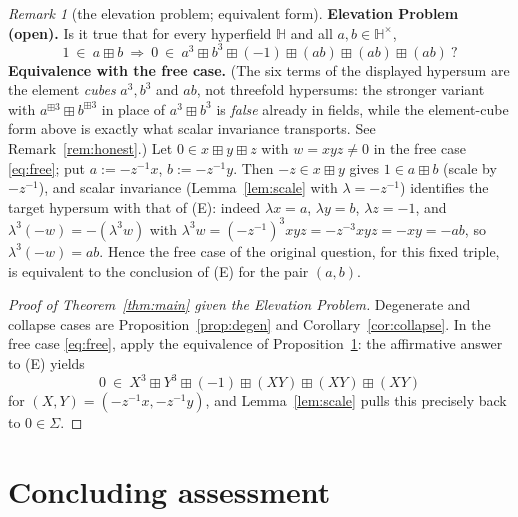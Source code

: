 \documentclass[11pt]{article}
\theoremstyle{definition}
\theoremstyle{remark}
\newtheorem{remark}[theorem]{Remark}
\newcommand{\Hb}{\mathbb{H}}
\newcommand{\bp}{\boxplus}
\begin{document}
\begin{remark}[the elevation problem; equivalent form]\label{prob:elevation}
\textbf{Elevation Problem (open).} Is it true that for every hyperfield
$\Hb$ and all $a,b\in\Hb^\times$,
\[
  1\ \in\ a\bp b\ \Longrightarrow\
   0\ \in\ a^{3}\bp b^{3}\bp(-1)\bp(ab)\bp(ab)\bp(ab)\ ?
   \tag{E}
\]
\textbf{Equivalence with the free case.} (The six terms of the displayed
hypersum are the element \emph{cubes} $a^3,b^3$ and $ab$, not threefold
hypersums: the stronger variant with $a^{\bp3}\bp b^{\bp3}$ in place of
$a^3\bp b^3$ is \emph{false} already in fields, while the element-cube
form above is exactly what scalar invariance transports. See
Remark~\ref{rem:honest}.) Let $0\in x\bp y\bp z$ with
$w=xyz\neq0$ in the free case \eqref{eq:free}; put $a:=-z^{-1}x$,
$b:=-z^{-1}y$. Then $-z\in x\bp y$ gives $1\in a\bp b$ (scale by
$-z^{-1}$), and scalar invariance (Lemma~\ref{lem:scale} with
$\lambda=-z^{-1}$) identifies the target hypersum with that of (E):
indeed $\lambda x=a$, $\lambda y=b$, $\lambda z=-1$, and
$\lambda^3(-w)=-(\lambda^3w)$ with
$\lambda^3w=(-z^{-1})^3xyz=-z^{-3}xyz=-xy=-ab$, so $\lambda^3(-w)=ab$.
Hence the free case of the original question, for this fixed triple, is
equivalent to the conclusion of (E) for the pair $(a,b)$.
\end{remark}

\begin{proof}[Proof of Theorem~\ref{thm:main} given the Elevation Problem]
Degenerate and collapse cases are
Proposition~\ref{prop:degen} and Corollary~\ref{cor:collapse}. In the
free case \eqref{eq:free}, apply the equivalence of
Proposition~\ref{prob:elevation}: the affirmative answer to (E) yields
\[
  0\ \in\ X^{3}\bp Y^{3}\bp(-1)\bp(XY)\bp(XY)\bp(XY)
\]
for $(X,Y)=(-z^{-1}x,-z^{-1}y)$, and Lemma~\ref{lem:scale} pulls this
precisely back to $0\in\Sigma$.
\end{proof}

\section{Concluding assessment}\label{sec:concl}
\end{document}
